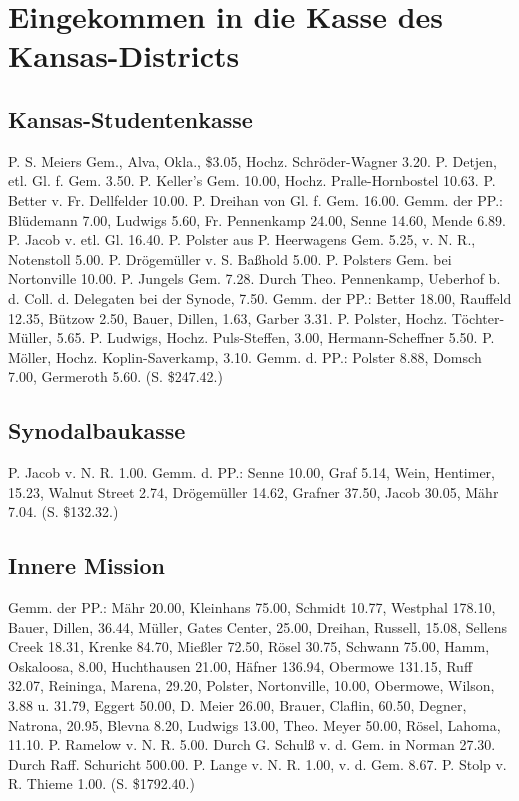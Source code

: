 \chapter[Kansas-District]{Eingekommen in die Kasse des Kansas-Districts}

\section{Kansas-Studentenkasse}
P. S. Meiers Gem., Alva, Okla., \$3.05, Hochz. Schröder-Wagner 3.20. P. Detjen, etl. Gl. f. Gem. 3.50. P. Keller’s Gem. 10.00, Hochz. Pralle-Hornbostel 10.63. P. Better v. Fr. Dellfelder 10.00. P. Dreihan von Gl. f. Gem. 16.00. Gemm. der PP.: Blüdemann 7.00, Ludwigs 5.60, Fr. Pennenkamp 24.00, Senne 14.60, Mende 6.89. P. Jacob v. etl. Gl. 16.40. P. Polster aus P. Heerwagens Gem. 5.25, v. N. R., Notenstoll 5.00. P. Drögemüller v. S. Baßhold 5.00. P. Polsters Gem. bei Nortonville 10.00. P. Jungels Gem. 7.28. Durch Theo. Pennenkamp, Ueberhof b. d. Coll. d. Delegaten bei der Synode, 7.50. Gemm. der PP.: Better 18.00, Rauffeld 12.35, Bützow 2.50, Bauer, Dillen, 1.63, Garber 3.31. P. Polster, Hochz. Töchter-Müller, 5.65. P. Ludwigs, Hochz. Puls-Steffen, 3.00, Hermann-Scheffner 5.50. P. Möller, Hochz. Koplin-Saverkamp, 3.10. Gemm. d. PP.: Polster 8.88, Domsch 7.00, Germeroth 5.60. (S. \$247.42.)

\section{Synodalbaukasse}
P. Jacob v. N. R. 1.00. Gemm. d. PP.: Senne 10.00, Graf 5.14, Wein, Hentimer, 15.23, Walnut Street 2.74, Drögemüller 14.62, Grafner 37.50, Jacob 30.05, Mähr 7.04. (S. \$132.32.)

\section{Innere Mission}
Gemm. der PP.: Mähr 20.00, Kleinhans 75.00, Schmidt 10.77, Westphal 178.10, Bauer, Dillen, 36.44, Müller, Gates Center, 25.00, Dreihan, Russell, 15.08, Sellens Creek 18.31, Krenke 84.70, Mießler 72.50, Rösel 30.75, Schwann 75.00, Hamm, Oskaloosa, 8.00, Huchthausen 21.00, Häfner 136.94, Obermowe 131.15, Ruff 32.07, Reininga, Marena, 29.20, Polster, Nortonville, 10.00, Obermowe, Wilson, 3.88 u. 31.79, Eggert 50.00, D. Meier 26.00, Brauer, Claflin, 60.50, Degner, Natrona, 20.95, Blevna 8.20, Ludwigs 13.00, Theo. Meyer 50.00, Rösel, Lahoma, 11.10. P. Ramelow v. N. R. 5.00. Durch G. Schulß v. d. Gem. in Norman 27.30. Durch Raff. Schuricht 500.00. P. Lange v. N. R. 1.00, v. d. Gem. 8.67. P. Stolp v. R. Thieme 1.00. (S. \$1792.40.)

